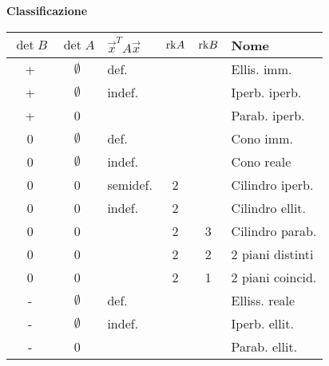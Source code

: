 \textbf{Classificazione}

\begin{tabular}{c|c|l|c|c|l}
	\boldmath$\det B$
	         & \boldmath$\det A$
	                       & \boldmath$\vec{x}^TA\vec{x}$
	                                  & \boldmath$\mathrm{rk} A$
	                                      & \boldmath$\mathrm{rk} B$
	                                             & \textbf{Nome} \\
	\hline
	+        & $\emptyset$ & def.     &   &      & Ellis. imm. \\
	+        & $\emptyset$ & indef.   &   &      & Iperb. iperb. \\
	+        & 0           &          &   &      & Parab. iperb. \\
	\hline
	0        & $\emptyset$ & def.     &   &      & Cono imm. \\
	0        & $\emptyset$ & indef.   &   &      & Cono reale \\
	0        & 0           & semidef. & 2 &      & Cilindro iperb. \\
	0        & 0           & indef.   & 2 &      & Cilindro ellit. \\
	0        & 0           &          & 2 & 3    & Cilindro parab. \\
	0        & 0           &          & 2 & 2    & 2 piani distinti \\
	0        & 0           &          & 2 & 1    & 2 piani coincid. \\
	\hline
	-        & $\emptyset$ & def.     &   &      & Elliss. reale \\
	-        & $\emptyset$ & indef.   &   &      & Iperb. ellit. \\
	-        & 0           &          &   &      & Parab. ellit. \\
\end{tabular}
